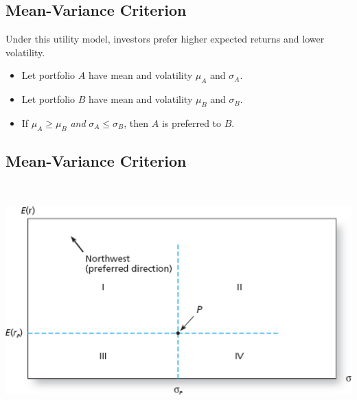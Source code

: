 \documentclass[letterpaper,10pt,english]{sphinxmanual}
\begin{document}
\subsection{Mean-Variance Criterion}
\label{allocation:mean-variance-criterion}
Under this utility model, investors prefer higher expected returns
and lower volatility.
\begin{itemize}
\item {} 
Let portfolio $A$ have mean and volatility $\mu_A$ and
$\sigma_A$.

\end{itemize}
\begin{itemize}
\item {} 
Let portfolio $B$ have mean and volatility $\mu_B$ and
$\sigma_B$.

\end{itemize}
\begin{itemize}
\item {} 
If $\mu_A \geq \mu_B$ \emph{and} $\sigma_A \leq
\sigma_B$, then $A$ is preferred to $B$.

\end{itemize}


\subsection{Mean-Variance Criterion}
\label{allocation:id2}
$\qquad$

\includegraphics[width=6in]{pg164_1.jpg}
\end{document}
